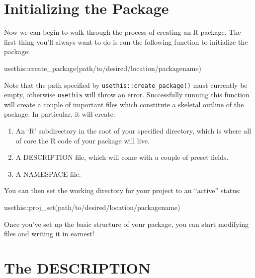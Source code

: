 \documentclass[
]{book}
\newenvironment{Shaded}{\begin{snugshade}}{\end{snugshade}}
\newcommand{\FunctionTok}[1]{\textcolor[rgb]{0.00,0.00,0.00}{#1}}
\newcommand{\NormalTok}[1]{#1}
\newcommand{\SpecialCharTok}[1]{\textcolor[rgb]{0.00,0.00,0.00}{#1}}
\newcommand{\StringTok}[1]{\textcolor[rgb]{0.31,0.60,0.02}{#1}}
\providecommand{\tightlist}{%
  \setlength{\itemsep}{0pt}\setlength{\parskip}{0pt}}
\begin{document}
\hypertarget{initializing-the-package}{%
\section{Initializing the Package}\label{initializing-the-package}}

Now we can begin to walk through the process of creating an R package. The first thing you'll always want to do is run the following function to initialize the package:

\begin{Shaded}
\begin{Highlighting}[]
\NormalTok{usethis}\SpecialCharTok{::}\FunctionTok{create\_package}\NormalTok{(}\StringTok{\textquotesingle{}path/to/desired/location/packagename\textquotesingle{}}\NormalTok{)}
\end{Highlighting}
\end{Shaded}

Note that the path specified by \texttt{usethis::create\_package()} must currently be empty, otherwise \texttt{usethis} will throw an error. Successfully running this function will create a couple of important files which constitute a skeletal outline of the package. In particular, it will create:

\begin{enumerate}
\def\labelenumi{\arabic{enumi}.}
\tightlist
\item
  An `R' subdirectory in the root of your specified directory, which is where all of core the R code of your package will live.
\item
  A DESCRIPTION file, which will come with a couple of preset fields.
\item
  A NAMESPACE file.
\end{enumerate}

You can then set the working directory for your project to an ``active'' status:

\begin{Shaded}
\begin{Highlighting}[]
\NormalTok{usethis}\SpecialCharTok{::}\FunctionTok{proj\_set}\NormalTok{(}\StringTok{\textquotesingle{}path/to/desired/location/packagename\textquotesingle{}}\NormalTok{)}
\end{Highlighting}
\end{Shaded}

Once you've set up the basic structure of your package, you can start modifying files and writing it in earnest!

\hypertarget{the-description}{%
\section{The DESCRIPTION}\label{the-description}}
\end{document}
